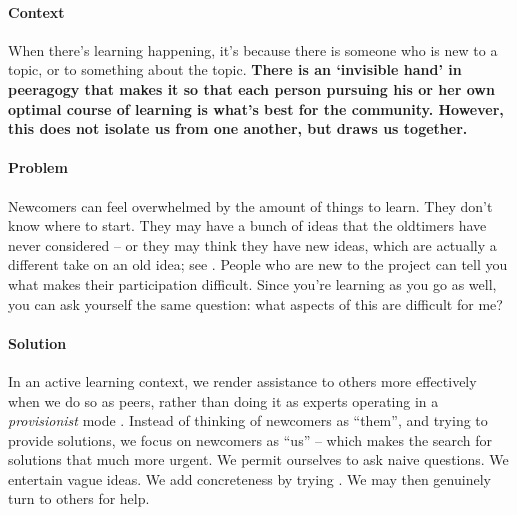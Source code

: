 \begin{refsection}



\paragraph{Context}
When there's learning happening, it's because there is someone who is new to a topic, or to something about the topic.
\textbf{There is an `invisible hand' in peeragogy that makes it so that each person pursuing his or her own optimal course of learning is what's best for the community.  However, this does not isolate us from one another, but draws us together.}

\paragraph{Problem} Newcomers can feel overwhelmed by the amount of things to learn.  They
don't know where to start.  They may have a bunch of ideas that the
oldtimers have never considered -- or they may think they have new
ideas, which are actually a different take on an old idea; see
. People who are new to the project can tell you what makes their participation difficult.  Since you're learning as you go as well, you can ask yourself the same question: what aspects of this are difficult for me?  

\paragraph{Solution}
In an active learning context, we render assistance to others more effectively when we do
so as peers, rather than doing it as experts operating in a \emph{provisionist} mode
\cite{boud2005peer}.  Instead of thinking of newcomers as
``them'', and trying to provide solutions, we focus on newcomers as
``us'' -- which makes the search for solutions that much more urgent.
We permit ourselves to ask naive questions.  We entertain vague ideas.
We add concreteness by trying .  We may then genuinely turn
to others for help. 

%

\end{refsection}
